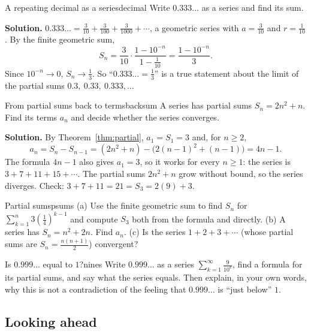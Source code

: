 \documentclass[11pt]{article}
\begin{document}
\begin{exmp}{A repeating decimal as a series}{decimal}
Write $0.333\ldots$ as a series and find its sum.

\textbf{Solution.} $0.333\ldots=\frac3{10}+\frac3{100}+\frac3{1000}+\cdots$, a geometric series with $a=\frac3{10}$ and $r=\frac1{10}$. By the finite geometric sum,
\[
S_n=\frac3{10}\cdot\frac{1-10^{-n}}{1-\frac1{10}}=\frac{1-10^{-n}}{3}.
\]
Since $10^{-n}\to0$, $S_n\to\frac13$. So ``$0.333\ldots=\frac13$'' is a true statement about the limit of the partial sums $0.3,\ 0.33,\ 0.333,\dots$
\end{exmp}

\begin{exmp}{From partial sums back to terms}{backsum}
A series has partial sums $S_n=2n^2+n$. Find its terms $a_n$ and decide whether the series converges.

\textbf{Solution.} By Theorem~\ref{thm:partial}, $a_1=S_1=3$ and, for $n\ge2$,
\[
a_n=S_n-S_{n-1}=(2n^2+n)-\big(2(n-1)^2+(n-1)\big)=4n-1 .
\]
The formula $4n-1$ also gives $a_1=3$, so it works for every $n\ge1$: the series is $3+7+11+15+\cdots$. The partial sums $2n^2+n$ grow without bound, so the series diverges. Check: $3+7+11=21=S_3=2(9)+3$.
\end{exmp}

\begin{kc}{Partial sums}{psums}
(a) Use the finite geometric sum to find $S_n$ for $\sum_{k=1}^{n}3\left(\frac14\right)^{k-1}$ and compute $S_3$ both from the formula and directly. (b) A series has $S_n=n^2+2n$. Find $a_n$. (c) Is the series $1+2+3+\cdots$ (whose partial sums are $S_n=\frac{n(n+1)}2$) convergent?
\end{kc}

\begin{think}{Is $0.999\ldots$ equal to $1$?}{nines}
Write $0.999\ldots$ as a series $\sum_{k=1}^\infty\frac9{10^k}$, find a formula for its partial sums, and say what the series equals. Then explain, in your own words, why this is not a contradiction of the feeling that $0.999\ldots$ is ``just below'' $1$.
\end{think}

\subsection*{Looking ahead}
\end{document}
